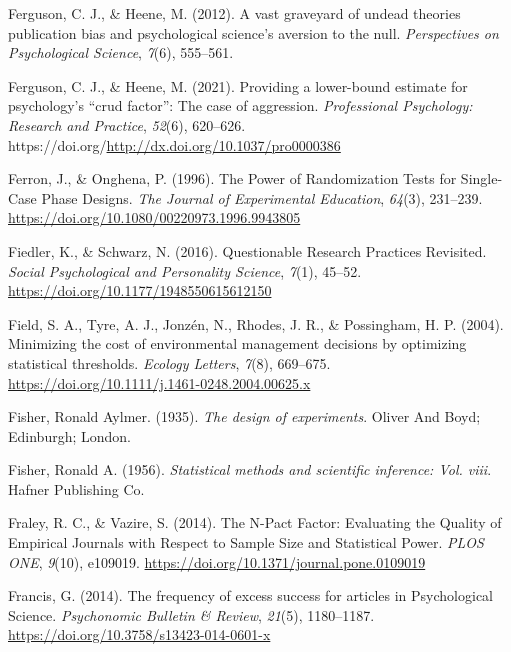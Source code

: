 \documentclass[
  letterpaper,
  DIV=11,
  numbers=noendperiod]{scrreprt}
\newlength{\cslhangindent}
\newlength{\cslentryspacingunit} %
\newenvironment{CSLReferences}[2] %
 {%
  \setlength{\parindent}{0pt}
  \ifodd #1
  \let\oldpar\par
  \def\par{\hangindent=\cslhangindent\oldpar}
  \fi
  \setlength{\parskip}{#2\cslentryspacingunit}
 }%
 {}
\begin{document}
\begin{CSLReferences}{1}{0}
\leavevmode{}%
Ferguson, C. J., \& Heene, M. (2012). A vast graveyard of undead
theories publication bias and psychological science's aversion to the
null. \emph{Perspectives on Psychological Science}, \emph{7}(6),
555--561.

\leavevmode{}%
Ferguson, C. J., \& Heene, M. (2021). Providing a lower-bound estimate
for psychology's {``crud factor''}: {The} case of aggression.
\emph{Professional Psychology: Research and Practice}, \emph{52}(6),
620--626. https://doi.org/\url{http://dx.doi.org/10.1037/pro0000386}

\leavevmode{}%
Ferron, J., \& Onghena, P. (1996). The {Power} of {Randomization Tests}
for {Single-Case Phase Designs}. \emph{The Journal of Experimental
Education}, \emph{64}(3), 231--239.
\url{https://doi.org/10.1080/00220973.1996.9943805}

\leavevmode{}%
Fiedler, K., \& Schwarz, N. (2016). Questionable {Research Practices
Revisited}. \emph{Social Psychological and Personality Science},
\emph{7}(1), 45--52. \url{https://doi.org/10.1177/1948550615612150}

\leavevmode{}%
Field, S. A., Tyre, A. J., Jonzén, N., Rhodes, J. R., \& Possingham, H.
P. (2004). Minimizing the cost of environmental management decisions by
optimizing statistical thresholds. \emph{Ecology Letters}, \emph{7}(8),
669--675. \url{https://doi.org/10.1111/j.1461-0248.2004.00625.x}

\leavevmode{}%
Fisher, Ronald Aylmer. (1935). \emph{The design of experiments}. {Oliver
And Boyd; Edinburgh; London}.

\leavevmode{}%
Fisher, Ronald A. (1956). \emph{Statistical methods and scientific
inference: Vol. viii}. {Hafner Publishing Co.}

\leavevmode{}%
Fraley, R. C., \& Vazire, S. (2014). The {N-Pact Factor}: {Evaluating}
the {Quality} of {Empirical Journals} with {Respect} to {Sample Size}
and {Statistical Power}. \emph{PLOS ONE}, \emph{9}(10), e109019.
\url{https://doi.org/10.1371/journal.pone.0109019}

\leavevmode{}%
Francis, G. (2014). The frequency of excess success for articles in
{Psychological Science}. \emph{Psychonomic Bulletin \& Review},
\emph{21}(5), 1180--1187.
\url{https://doi.org/10.3758/s13423-014-0601-x}


\end{CSLReferences}
\end{document}
